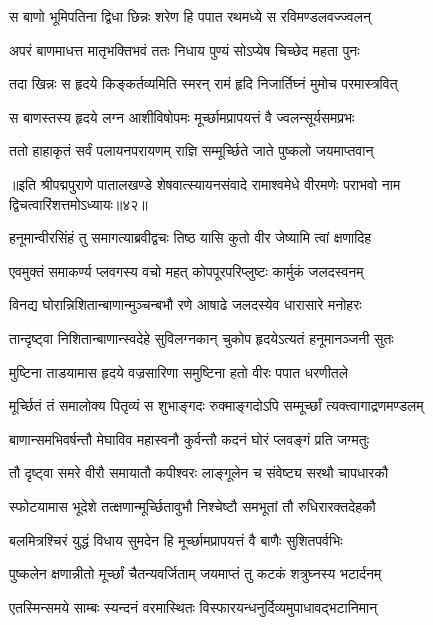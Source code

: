 \twolineshloka
{स बाणो भूमिपतिना द्विधा छिन्नः शरेण हि}
{पपात रथमध्ये स रविमण्डलवज्ज्वलन्}%

\twolineshloka
{अपरं बाणमाधत्त मातृभक्तिभवं ततः}
{निधाय पुण्यं सोऽप्येष चिच्छेद महता पुनः}%

\twolineshloka
{तदा खिन्नः स हृदये किङ्कर्तव्यमिति स्मरन्}
{रामं हृदि निजार्तिघ्नं मुमोच परमास्त्रवित्}%

\twolineshloka
{स बाणस्तस्य हृदये लग्न आशीविषोपमः}
{मूर्च्छामप्रापयत्तं वै ज्वलन्सूर्यसमप्रभः}%

\twolineshloka
{ततो हाहाकृतं सर्वं पलायनपरायणम्}
{राज्ञि सम्मूर्च्छिते जाते पुष्कलो जयमाप्तवान्}%

{॥इति श्रीपद्मपुराणे पातालखण्डे शेषवात्स्यायनसंवादे रामाश्वमेधे वीरमणेः पराभवो नाम द्विचत्वारिंशत्तमोऽध्यायः॥४२॥}



\twolineshloka
{हनूमान्वीरसिंहं तु समागत्याब्रवीद्वचः}
{तिष्ठ यासि कुतो वीर जेष्यामि त्वां क्षणादिह}%

\twolineshloka
{एवमुक्तं समाकर्ण्य प्लवगस्य वचो महत्}
{कोपपूरपरिप्लुष्टः कार्मुकं जलदस्वनम्}%

\twolineshloka
{विनद्य घोरान्निशितान्बाणान्मुञ्चन्बभौ रणे}
{आषाढे जलदस्येव धारासारे मनोहरः}%

\twolineshloka
{तान्दृष्ट्वा निशितान्बाणान्स्वदेहे सुविलग्नकान्}
{चुकोप हृदयेऽत्यतं हनूमानञ्जनी सुतः}%

\twolineshloka
{मुष्टिना ताडयामास हृदये वज्रसारिणा}
{समुष्टिना हतो वीरः पपात धरणीतले}%

\twolineshloka
{मूर्च्छितं तं समालोक्य पितृव्यं स शुभाङ्गदः}
{रुक्माङ्गदोऽपि सम्मूर्च्छां त्यक्त्वागाद्रणमण्डलम्}%

\twolineshloka
{बाणान्समभिवर्षन्तौ मेघाविव महास्वनौ}
{कुर्वन्तौ कदनं घोरं प्लवङ्गं प्रति जग्मतुः}%

\twolineshloka
{तौ दृष्ट्वा समरे वीरौ समायातौ कपीश्वरः}
{लाङ्गूलेन च संवेष्ट्य सरथौ चापधारकौ}%

\twolineshloka
{स्फोटयामास भूदेशे तत्क्षणान्मूर्च्छितावुभौ}
{निश्चेष्टौ समभूतां तौ रुधिरारक्तदेहकौ}%

\twolineshloka
{बलमित्रश्चिरं युद्धं विधाय सुमदेन हि}
{मूर्च्छामप्रापयत्तं वै बाणैः सुशितपर्वभिः}%

\twolineshloka
{पुष्कलेन क्षणान्नीतो मूर्च्छां चैतन्यवर्जिताम्}
{जयमाप्तं तु कटकं शत्रुघ्नस्य भटार्दनम्}%

\twolineshloka
{एतस्मिन्समये साम्बः स्यन्दनं वरमास्थितः}
{विस्फारयन्धनुर्दिव्यमुपाधावद्भटानिमान्}%

